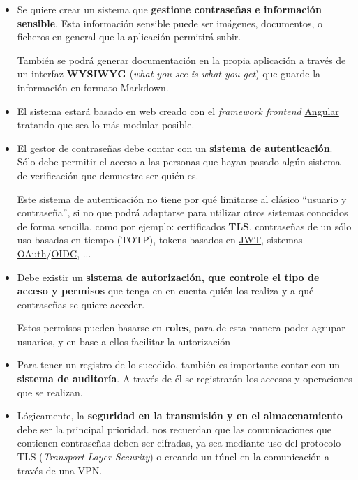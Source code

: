 \documentclass{\ClassPath/viu-tfm-template}
\begin{document}
\begin{itemize}

    \item Se quiere crear un sistema que \textbf{gestione contraseñas e información sensible}. Esta información sensible puede ser imágenes, documentos, o ficheros en general que la aplicación permitirá subir.

    También se podrá generar documentación en la propia aplicación a través de un interfaz \textbf{WYSIWYG} (\textit{what you see is what you get}) que guarde la información en formato Markdown.

    \item El sistema estará basado en web creado con el \textit{framework frontend} \href{https://angular.io/}{Angular} tratando que sea lo más modular posible.

    \item El gestor de contraseñas debe contar con un \textbf{sistema de autenticación}. Sólo debe permitir el acceso a las personas que hayan pasado algún sistema de verificación que demuestre ser quién es.

    Este sistema de autenticación no tiene por qué limitarse al clásico “usuario y contraseña”, si no que podrá adaptarse para utilizar otros sistemas conocidos de forma sencilla, como por ejemplo: certificados \textbf{TLS}, contraseñas de un sólo uso basadas en tiempo (TOTP), tokens basados en \href{https://en.wikipedia.org/wiki/JSON_Web_Token}{JWT}, sistemas \href{https://en.wikipedia.org/wiki/OAuth}{OAuth}/\href{https://en.wikipedia.org/wiki/OpenID#OpenID_Connect_(OIDC)}{OIDC}, ...

    \item Debe existir un \textbf{sistema de autorización, que controle el tipo de acceso y permisos} que tenga en en cuenta quién los realiza y a qué contraseñas se quiere acceder.

    Estos permisos pueden basarse en \textbf{roles}, para de esta manera poder agrupar usuarios, y en base a ellos facilitar la autorización

    \item Para tener un registro de lo sucedido, también es importante contar con un \textbf{sistema de auditoría}. A través de él se registrarán los accesos y operaciones que se realizan.

    \item Lógicamente, la \textbf{seguridad en la transmisión y en el almacenamiento} debe ser la principal prioridad.  \textcite{scarfone2009guide} nos recuerdan que las comunicaciones que contienen contraseñas deben ser cifradas, ya sea mediante uso del protocolo TLS (\textit{Transport Layer Security}) o creando un túnel en la comunicación a través de una VPN.


\end{itemize}
\end{document}
